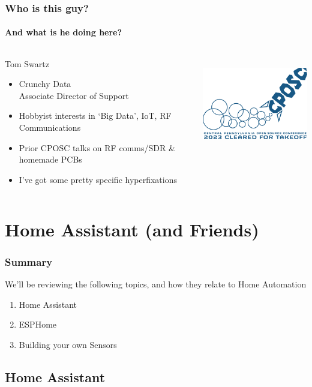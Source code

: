 \documentclass[aspectratio=169]{beamer}
\begin{document}
\begin{frame}
  \frametitle{Who is this guy?}
  \framesubtitle{And what is he doing here?}
  \begin{columns}[]
    \begin{column}[T]{0.45\paperwidth}
      {\huge Tom Swartz}
      \vfill
      \begin{itemize}[<+->]
        \item{Crunchy Data \\ Associate Director of Support}
        \item{Hobbyist interests in `Big Data', IoT, RF Communications}
        \item{Prior CPOSC talks on RF comms/SDR \& homemade PCBs}
        \item{I've got some pretty specific hyperfixations}
      \end{itemize}
    \end{column}
    \begin{column}[T]{0.45\paperwidth}
      \includegraphics[height=4cm,keepaspectratio]{images/logo.png}
    \end{column}
  \end{columns}
\end{frame}

\section{Home Assistant (and Friends)}
\begin{frame}
  \frametitle{Summary}
  We'll be reviewing the following topics, and how they relate to Home Automation
  \begin{enumerate}
    \item{Home Assistant}
    \item{ESPHome}
    \item{Building your own Sensors}
  \end{enumerate}
\end{frame}

\subsection{Home Assistant}
\frame{\subsectionpage}
\end{document}
